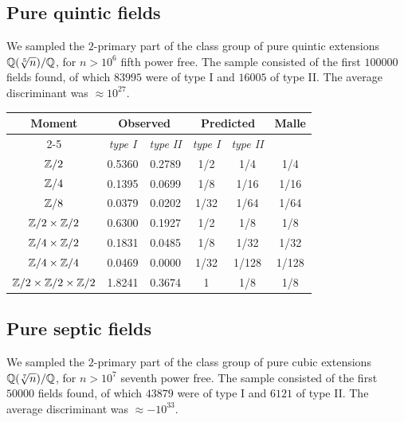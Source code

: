 \documentclass[11pt,a4paper]{amsart}
\def\Z{{\rm \mathbb{Z}}}
\def\Q{{\rm \mathbb{Q}}}
\numberwithin{equation}{section}
\begin{document}
\subsection{Pure quintic fields} 
\label{tbl: pure quintic fields}

We sampled the $2$-primary part of the class group of pure quintic extensions $\Q(\sqrt[5]{n})/\Q$, for $n> 10^6$ fifth power free. The sample consisted of the first $100000$ fields found, of which $83995$ were of type I and $16005$ of type II. The average discriminant was $\approx 10^{27}$.  \\

\begin{center}
\begin{tabular}{|c|c||c|c||c|c|}\hline
\multirow{2}{*}{\textbf{Moment}} & \multicolumn{2}{c|}{\textbf{Observed}} & \multicolumn{2}{c|}{\textbf{Predicted}} & \multirow{2}{*}{\textbf{Malle}} \\ \cline{2-5}
& \textit{type I} & \textit{type II} & \textit{type I} & \textit{type II} &  \\ \hline 
$\Z/2$ & 0.5360 & 0.2789 & \cellcolor{lightgray} 1/2 &  1/4 & 1/4 \\ \hline 
$\Z/4$ & 0.1395 & 0.0699 & 1/8  & 1/16 & 1/16 \\ \hline
$\Z/8$ & 0.0379 & 0.0202 & 1/32 & 1/64 & 1/64 \\ \hline
$\Z/2 \times \Z/2$ & 0.6300 & 0.1927 & \cellcolor{lightgray} 1/2  & 1/8 & 1/8 \\ \hline
$\Z/4 \times \Z/2$ & 0.1831 & 0.0485 & 1/8 & 1/32 & 1/32 \\ \hline
$\Z/4 \times \Z/4$ & 0.0469 & 0.0000 & 1/32 & 1/128 & 1/128 \\ \hline
$\Z/2 \times \Z/2 \times \Z/2$ & 1.8241 & 0.3674 & \cellcolor{lightgray} 1 & 1/8  & 1/8 \\ \hline
\end{tabular}
\end{center}


\subsection{Pure septic fields} 
\label{tbl: pure septic fields}

We sampled the $2$-primary part of the class group of pure cubic extensions $\Q(\sqrt[7]{n})/\Q$, for $n > 10^7$ seventh power free. The sample consisted of the first $50000$ fields found, of which $43879$ were of type I and $6121$ of type II. The average discriminant was $\approx -10^{33}$. \\
\end{document}
